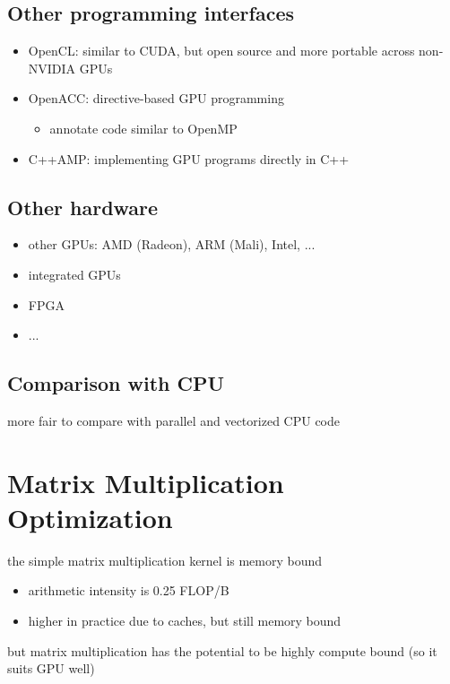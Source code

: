 \documentclass{article}
\begin{document}
\subsection{Other programming interfaces}

\begin{itemize}
\item OpenCL: similar to CUDA, but open source and more portable across non-NVIDIA GPUs
\item OpenACC: directive-based GPU programming
\begin{itemize}
\item annotate code similar to OpenMP
\end{itemize}
\item C++AMP: implementing GPU programs directly in C++

\end{itemize}
\subsection{Other hardware}


\begin{itemize}
\item other GPUs: AMD (Radeon), ARM (Mali), Intel, ...
\item integrated GPUs
\item FPGA
\item ...
\end{itemize}

\subsection{Comparison with CPU}

more fair to compare with parallel and vectorized CPU code


\section{Matrix Multiplication Optimization}

the simple matrix multiplication kernel is memory bound

\begin{itemize}
\item arithmetic intensity is 0.25 FLOP/B
\item higher in practice due to caches, but still memory bound
\end{itemize}
but matrix multiplication has the potential to be highly compute bound (so it suits GPU well)
\end{document}
